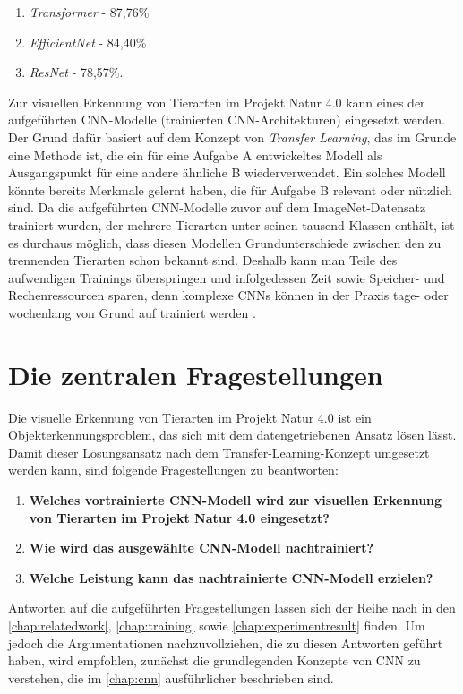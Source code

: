 \begin{enumerate}
	\item \emph{Transformer} \cite{dosovitskiy2021image} - 87,76\%
	\item \emph{EfficientNet} \cite{tan2020efficientnet} - 84,40\%
	\item \emph{ResNet} \cite{he2015deep} - 78,57\%.
\end{enumerate}

Zur visuellen Erkennung von Tierarten im Projekt Natur 4.0 kann eines der aufgeführten CNN-Modelle (trainierten CNN-Architekturen) eingesetzt werden. Der Grund dafür basiert auf dem Konzept von \emph{Transfer Learning}, das im Grunde eine Methode ist, die ein für eine Aufgabe A entwickeltes Modell als Ausgangspunkt für eine andere ähnliche B wiederverwendet. Ein solches Modell könnte bereits Merkmale gelernt haben, die für Aufgabe B relevant oder nützlich sind. Da die aufgeführten CNN-Modelle zuvor auf dem ImageNet-Datensatz trainiert wurden, der mehrere Tierarten unter seinen tausend Klassen enthält, ist es durchaus möglich, dass diesen Modellen Grundunterschiede zwischen den zu trennenden Tierarten schon bekannt sind. Deshalb kann man Teile des aufwendigen Trainings überspringen und infolgedessen Zeit sowie Speicher- und Rechenressourcen sparen, denn komplexe CNNs können in der Praxis tage- oder wochenlang von Grund auf trainiert werden  \cite[4]{Schroff_2015}\cite[1]{codreanu2017scale}\cite{BBVADeepLearning,StanfordDAWNBench}. 

\section{Die zentralen Fragestellungen}

Die visuelle Erkennung von Tierarten im Projekt Natur 4.0 ist ein Objekterkennungsproblem, das sich mit dem datengetriebenen Ansatz lösen lässt. Damit dieser Lösungsansatz nach dem Transfer-Learning-Konzept umgesetzt werden kann, sind folgende Fragestellungen zu beantworten:

\begin{enumerate}
	\item \textbf{Welches vortrainierte CNN-Modell wird zur visuellen Erkennung von Tierarten im Projekt Natur 4.0 eingesetzt?}
	
	\item \textbf{Wie wird das ausgewählte CNN-Modell nachtrainiert?}
	
	\item \textbf{Welche Leistung kann das nachtrainierte CNN-Modell erzielen?}
\end{enumerate}

Antworten auf die aufgeführten Fragestellungen lassen sich der Reihe nach in den \autoref{chap:relatedwork}, \autoref{chap:training} sowie \autoref{chap:experimentresult} finden. Um jedoch die Argumentationen nachzuvollziehen, die zu diesen Antworten geführt haben, wird empfohlen, zunächst die grundlegenden Konzepte von CNN zu verstehen, die im \autoref{chap:cnn} ausführlicher beschrieben sind.